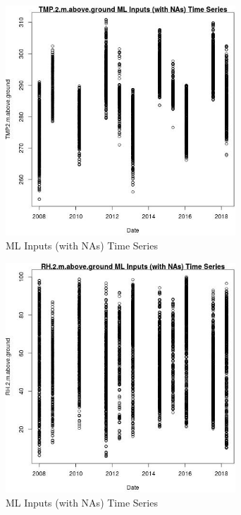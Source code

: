 \begin{figure} 
\centering  
\includegraphics[width=0.77\textwidth]{Code_Outputs/Report_ML_input_PM25_Step4_part_e_de_duplicated_aves_compiled_2019-05-18wNAs_TMP2mabovegroundvDate.jpg} 
\caption{\label{fig:Report_ML_input_PM25_Step4_part_e_de_duplicated_aves_compiled_2019-05-18wNAsTMP2mabovegroundvDate}ML Inputs (with NAs) Time Series} 
\end{figure} 
 

\begin{figure} 
\centering  
\includegraphics[width=0.77\textwidth]{Code_Outputs/Report_ML_input_PM25_Step4_part_e_de_duplicated_aves_compiled_2019-05-18wNAs_RH2mabovegroundvDate.jpg} 
\caption{\label{fig:Report_ML_input_PM25_Step4_part_e_de_duplicated_aves_compiled_2019-05-18wNAsRH2mabovegroundvDate}ML Inputs (with NAs) Time Series} 
\end{figure} 
 


